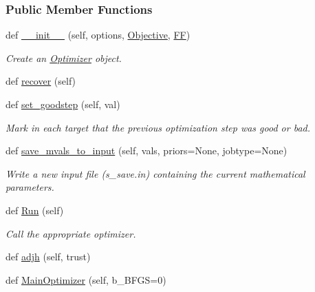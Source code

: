\subsubsection*{Public Member Functions}
\begin{DoxyCompactItemize}
\item 
def \hyperlink{classsrc_1_1optimizer_1_1Optimizer_acdeb46fca44a2f74dad4e3ae1fa9bebf}{\+\_\+\+\_\+init\+\_\+\+\_\+} (self, options, \hyperlink{classsrc_1_1optimizer_1_1Optimizer_ab2a3d627b6f6cb2f76f22e97c9a2ef40}{Objective}, \hyperlink{classsrc_1_1optimizer_1_1Optimizer_a4bbc39a0dc533c4d9caeb5516030dd26}{FF})
\begin{DoxyCompactList}\small\item\em Create an \hyperlink{classsrc_1_1optimizer_1_1Optimizer}{Optimizer} object. \end{DoxyCompactList}\item 
def \hyperlink{classsrc_1_1optimizer_1_1Optimizer_af63201bdb35965f56f59d1c2a859e9d1}{recover} (self)
\item 
def \hyperlink{classsrc_1_1optimizer_1_1Optimizer_abb29ac2f8b4bd4fca545eb3f6b0470fe}{set\+\_\+goodstep} (self, val)
\begin{DoxyCompactList}\small\item\em Mark in each target that the previous optimization step was good or bad. \end{DoxyCompactList}\item 
def \hyperlink{classsrc_1_1optimizer_1_1Optimizer_ad9b6a3c28ccacbbe26504e1e7676b244}{save\+\_\+mvals\+\_\+to\+\_\+input} (self, vals, priors=None, jobtype=None)
\begin{DoxyCompactList}\small\item\em Write a new input file (s\+\_\+save.\+in) containing the current mathematical parameters. \end{DoxyCompactList}\item 
def \hyperlink{classsrc_1_1optimizer_1_1Optimizer_adddfd056a9bc782ac5313590a82733e3}{Run} (self)
\begin{DoxyCompactList}\small\item\em Call the appropriate optimizer. \end{DoxyCompactList}\item 
def \hyperlink{classsrc_1_1optimizer_1_1Optimizer_a7ec731011adb2f1b994dfa112e364e7d}{adjh} (self, trust)
\item 
def \hyperlink{classsrc_1_1optimizer_1_1Optimizer_a30443d919712b0f3529de3c7d62619ca}{Main\+Optimizer} (self, b\+\_\+\+B\+F\+GS=0)

\end{DoxyCompactItemize}
